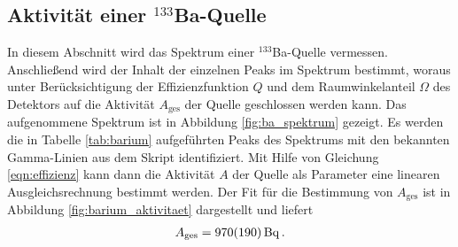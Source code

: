 \subsection{Aktivität einer $^{133}$Ba-Quelle} %
\label{sub:ba_quelle}
In diesem Abschnitt wird das Spektrum einer $^{133}$Ba-Quelle vermessen.
Anschließend wird der Inhalt der einzelnen Peaks im Spektrum bestimmt,
woraus unter Berücksichtigung der Effizienzfunktion $Q$ und dem
Raumwinkelanteil $\Omega$ des Detektors auf die Aktivität $A_\text{ges}$
der Quelle geschlossen werden kann.
Das aufgenommene Spektrum ist in Abbildung \ref{fig:ba_spektrum} gezeigt.
Es werden die in Tabelle \ref{tab:barium} aufgeführten Peaks des Spektrums
mit den bekannten Gamma-Linien aus dem Skript identifiziert.
Mit Hilfe von Gleichung \eqref{eqn:effizienz} kann dann die Aktivität $A$
der Quelle als Parameter eine linearen Ausgleichsrechnung bestimmt werden.
Der Fit für die Bestimmung von $A_\text{ges}$ ist in Abbildung
\ref{fig:barium_aktivitaet} dargestellt und liefert
\begin{align*}
    A_\text{ges} = \SI{970+-190}{\becquerel}\,.
\end{align*}
